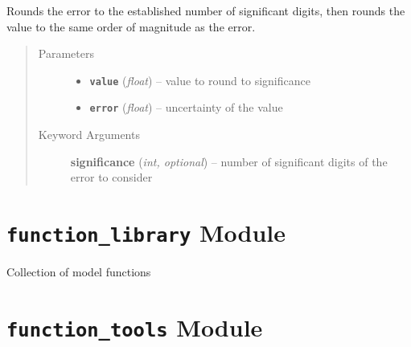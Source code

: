 \documentclass[a4paper,10pt,english]{sphinxmanual}
\begin{document}

\begin{fulllineitems}
\label{index:kafe.fit.round_to_significance}
Rounds the error to the established number of significant digits, then
rounds the value to the same order of magnitude as the error.
\begin{quote}\begin{description}
\item[{Parameters}] \leavevmode\begin{itemize}
\item {} 
\textbf{\texttt{value}} (\emph{float}) -- value to round to significance

\item {} 
\textbf{\texttt{error}} (\emph{float}) -- uncertainty of the value

\end{itemize}

\item[{Keyword Arguments}] \leavevmode
\textbf{significance} (\emph{int, optional}) --
number of significant digits of the error to consider

\end{description}\end{quote}

\end{fulllineitems}



\section{\texttt{function\_library} Module}
\label{index:module-kafe.function_library}\label{index:function-library-module}\label{index:module-function_library}
Collection of model functions


\section{\texttt{function\_tools} Module}
\label{index:module-kafe.function_tools}\label{index:function-tools-module}\label{index:module-function_tools}
\end{document}
